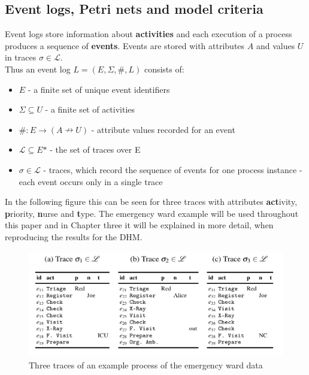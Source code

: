 \subsection{Event logs, Petri nets and model criteria}
Event logs store information about \textbf{activities} and each execution of a process produces a sequence of \textbf{events}. Events are stored with attributes $A$ and values $U$ in traces $\sigma \in \mathscr{L}$.\\
Thus an event log $L = (E, \Sigma, \#, L)$ consists of:


\begin{itemize}
\setlength{\itemsep}{3pt}
\item{$E$ - a finite set of unique event identifiers}
\item{$\Sigma \subseteq U$ - a finite set of activities}
\item{$\# : E \rightarrow (A \nrightarrow U)$ - attribute values recorded for an event}
\item{$\mathscr{L} \subseteq E\text{*}$ - the set of traces over E}
\item{$\sigma \in \mathscr{L}$ - traces, which record the sequence of events for
one process instance - each event occurs only in a single trace}
\end{itemize}

\noindent In the following figure this can be seen for three traces with attributes \textbf{act}ivity, \textbf{p}riority, \textbf{n}urse and \textbf{t}ype. The emergency ward example will be used throughout this paper and in Chapter three it will be explained in more detail, when reproducing the results for the DHM. \protect\cite{Mannhardt17}

\begin{figure}[H]
\includegraphics[width=14cm]{Chapters/Graphics_Paper/Event_Traces_ex_HB.jpg}
\caption{Three traces of an example process of the emergency ward data \protect\cite{Mannhardt17}} 
\end{figure}

